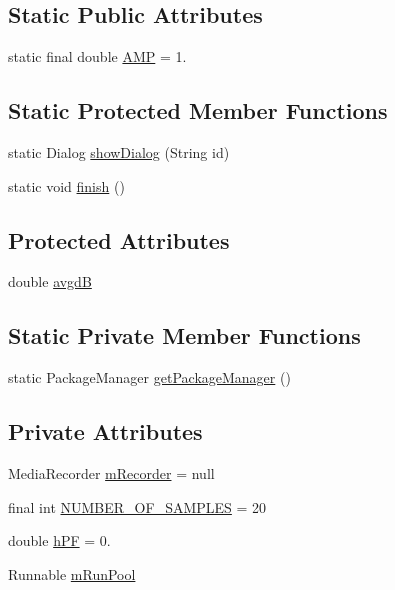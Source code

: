 \subsection*{Static Public Attributes}
\begin{DoxyCompactItemize}
\item 
static final double \hyperlink{classcs_1_1nsense_1_1microphone_1_1_sound_manager_a145a272b16be5038a5ad81e74fc8d865}{A\-M\-P} = 1.
\end{DoxyCompactItemize}
\subsection*{Static Protected Member Functions}
\begin{DoxyCompactItemize}
\item 
static Dialog \hyperlink{classcs_1_1nsense_1_1microphone_1_1_sound_manager_a1a79bd25b0a5b7859efbaa40eb9c559e}{show\-Dialog} (String id)
\item 
static void \hyperlink{classcs_1_1nsense_1_1microphone_1_1_sound_manager_aab423b8b477faa76b19cf67abf572100}{finish} ()
\end{DoxyCompactItemize}
\subsection*{Protected Attributes}
\begin{DoxyCompactItemize}
\item 
double \hyperlink{classcs_1_1nsense_1_1microphone_1_1_sound_manager_a20b7d00992d09dde85f8e995eb1fa2e3}{avgd\-B}
\end{DoxyCompactItemize}
\subsection*{Static Private Member Functions}
\begin{DoxyCompactItemize}
\item 
static Package\-Manager \hyperlink{classcs_1_1nsense_1_1microphone_1_1_sound_manager_aa5061a5ba5069d202b2d13ad58082fa8}{get\-Package\-Manager} ()
\end{DoxyCompactItemize}
\subsection*{Private Attributes}
\begin{DoxyCompactItemize}
\item 
Media\-Recorder \hyperlink{classcs_1_1nsense_1_1microphone_1_1_sound_manager_a854c1c483aca7d2a6a33b4a821236f4e}{m\-Recorder} = null
\item 
final int \hyperlink{classcs_1_1nsense_1_1microphone_1_1_sound_manager_a9f9a93940cfbf077ee9a16dfd502c102}{N\-U\-M\-B\-E\-R\-\_\-\-O\-F\-\_\-\-S\-A\-M\-P\-L\-E\-S} = 20
\item 
double \hyperlink{classcs_1_1nsense_1_1microphone_1_1_sound_manager_a4de0ad04d28edac2243b926db8e1d325}{h\-P\-F} = 0.
\item 
Runnable \hyperlink{classcs_1_1nsense_1_1microphone_1_1_sound_manager_a53bde011025269b9c80e1be4e52abd45}{m\-Run\-Pool}
\end{DoxyCompactItemize}
